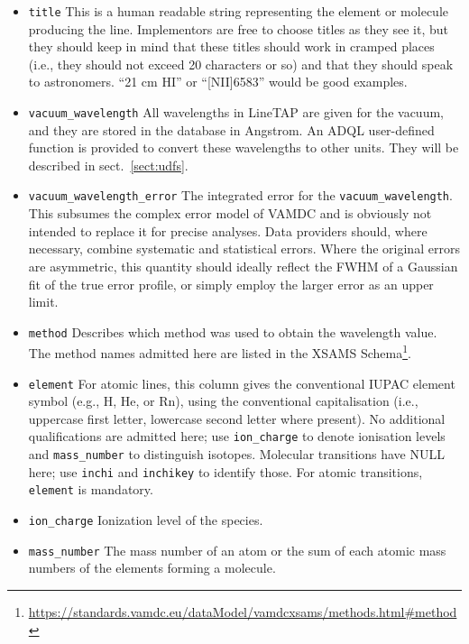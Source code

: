 \documentclass[11pt,a4paper]{ivoa}
\begin{document}
\begin{itemize}

\item \texttt{title} This is a human readable string representing the
element or molecule producing the line.  Implementors are free to choose
titles as they see it, but they should keep in mind that these titles
should work in cramped places (i.e., they should not exceed 20
characters or so) and that they should speak to astronomers.  ``21 cm
HI'' or ``[NII]6583'' would be good examples.

\item \texttt{vacuum\_wavelength}
All wavelengths in LineTAP are given for the vacuum,
and  they are stored in the database in
Angstrom.  An  ADQL user-defined function is provided to convert these
wavelengths to other units. They will be described in
sect.~\ref{sect:udfs}.

\item \texttt{vacuum\_wavelength\_error} The integrated error for the
\texttt{vacuum\_wave\-length}.  This subsumes the complex error model of
VAMDC and is obviously not intended to replace it for precise analyses.
Data providers should, where necessary, combine systematic and
statistical errors.  Where the original errors are asymmetric, this
quantity should ideally reflect the FWHM of a Gaussian fit of the true
error profile, or simply employ the larger error as an upper limit.

\item \texttt{method} Describes which method was used to obtain the
wavelength value. The method names admitted here are listed in the XSAMS
Schema\footnote{\url{https://standards.vamdc.eu/dataModel/vamdcxsams/methods.html\#method}}.

\item \texttt{element} For atomic lines, this column gives the
conventional IUPAC element symbol (e.g., H, He, or Rn), using the
conventional capitalisation (i.e., uppercase first letter, lowercase
second letter where present).  No additional qualifications are admitted
here; use \texttt{ion\_charge} to denote ionisation levels and
\texttt{mass\_number} to distinguish isotopes.  Molecular transitions
have NULL here; use \texttt{inchi} and \texttt{inchikey} to identify
those.  For atomic transitions, \texttt{element} is mandatory.

\item \texttt{ion\_charge} Ionization level of the species.

\item \texttt{mass\_number} The mass number of an atom or the sum of
each atomic mass numbers of the elements forming a molecule.


\end{itemize}
\end{document}
